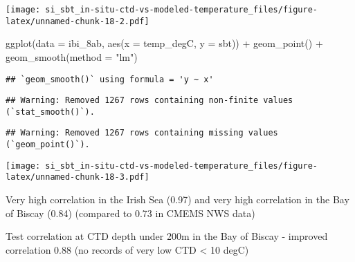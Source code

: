 \documentclass[
]{article}
\newenvironment{Shaded}{\begin{snugshade}}{\end{snugshade}}
\newcommand{\AttributeTok}[1]{\textcolor[rgb]{0.77,0.63,0.00}{#1}}
\newcommand{\CommentTok}[1]{\textcolor[rgb]{0.56,0.35,0.01}{\textit{#1}}}
\newcommand{\DecValTok}[1]{\textcolor[rgb]{0.00,0.00,0.81}{#1}}
\newcommand{\FunctionTok}[1]{\textcolor[rgb]{0.00,0.00,0.00}{#1}}
\newcommand{\NormalTok}[1]{#1}
\newcommand{\OtherTok}[1]{\textcolor[rgb]{0.56,0.35,0.01}{#1}}
\newcommand{\SpecialCharTok}[1]{\textcolor[rgb]{0.00,0.00,0.00}{#1}}
\newcommand{\StringTok}[1]{\textcolor[rgb]{0.31,0.60,0.02}{#1}}
\begin{document}
\texttt{[image: si\_sbt\_in-situ-ctd-vs-modeled-temperature\_files/figure-latex/unnamed-chunk-18-2.pdf]}

\begin{Shaded}
\begin{Highlighting}[]
\FunctionTok{ggplot}\NormalTok{(}\AttributeTok{data =}\NormalTok{ ibi\_8ab, }\FunctionTok{aes}\NormalTok{(}\AttributeTok{x =}\NormalTok{ temp\_degC, }\AttributeTok{y =}\NormalTok{ sbt)) }\SpecialCharTok{+} \FunctionTok{geom\_point}\NormalTok{() }\SpecialCharTok{+} \FunctionTok{geom\_smooth}\NormalTok{(}\AttributeTok{method =} \StringTok{"lm"}\NormalTok{)}
\end{Highlighting}
\end{Shaded}

\begin{verbatim}
## `geom_smooth()` using formula = 'y ~ x'
\end{verbatim}

\begin{verbatim}
## Warning: Removed 1267 rows containing non-finite values (`stat_smooth()`).
\end{verbatim}

\begin{verbatim}
## Warning: Removed 1267 rows containing missing values (`geom_point()`).
\end{verbatim}

\texttt{[image: si\_sbt\_in-situ-ctd-vs-modeled-temperature\_files/figure-latex/unnamed-chunk-18-3.pdf]}

Very high correlation in the Irish Sea (0.97) and very high correlation
in the Bay of Biscay (0.84) (compared to 0.73 in CMEMS NWS data)

Test correlation at CTD depth under 200m in the Bay of Biscay - improved
correlation 0.88 (no records of very low CTD \textless{} 10 degC)

\begin{Shaded}
\end{Shaded}
\end{document}
